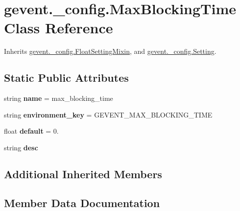 \hypertarget{classgevent_1_1__config_1_1_max_blocking_time}{}\section{gevent.\+\_\+config.\+Max\+Blocking\+Time Class Reference}
\label{classgevent_1_1__config_1_1_max_blocking_time}


Inherits \hyperlink{classgevent_1_1__config_1_1_float_setting_mixin}{gevent.\+\_\+config.\+Float\+Setting\+Mixin}, and \hyperlink{classgevent_1_1__config_1_1_setting}{gevent.\+\_\+config.\+Setting}.

\subsection*{Static Public Attributes}
\begin{DoxyCompactItemize}
\item 
\mbox{\label{classgevent_1_1__config_1_1_max_blocking_time_a90cc8c2bd2cac342304547ac7269948f}} 
string {\bfseries name} = \textquotesingle{}max\+\_\+blocking\+\_\+time\textquotesingle{}
\item 
\mbox{\label{classgevent_1_1__config_1_1_max_blocking_time_ad80a9b39686c57a432ebed4ed575176b}} 
string {\bfseries environment\+\_\+key} = \textquotesingle{}G\+E\+V\+E\+N\+T\+\_\+\+M\+A\+X\+\_\+\+B\+L\+O\+C\+K\+I\+N\+G\+\_\+\+T\+I\+ME\textquotesingle{}
\item 
\mbox{\label{classgevent_1_1__config_1_1_max_blocking_time_a59b88b2026cd5b3f83153be072dba87c}} 
float {\bfseries default} = 0.
\item 
string {\bfseries desc}
\end{DoxyCompactItemize}
\subsection*{Additional Inherited Members}


\subsection{Member Data Documentation}
\mbox{\label{classgevent_1_1__config_1_1_max_blocking_time_a6e3c69a5339f95c35892d4e4f53e517f}} 
